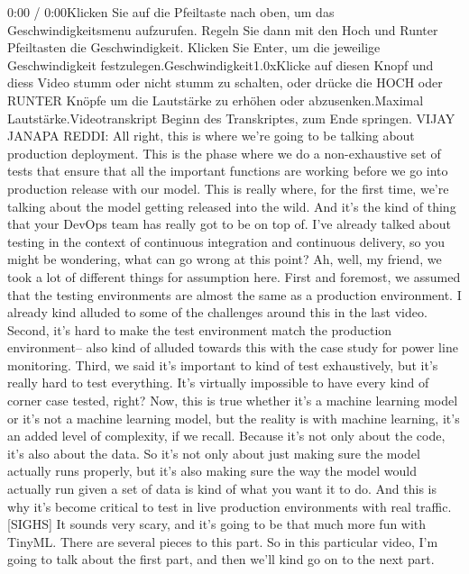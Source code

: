{{{{    0:00 / 0:00Klicken Sie auf die Pfeiltaste nach oben, um das Geschwindigkeitsmenu aufzurufen. Regeln Sie dann mit den Hoch und Runter Pfeiltasten die Geschwindigkeit. Klicken Sie Enter, um die jeweilige Geschwindigkeit festzulegen.Geschwindigkeit1.0xKlicke auf diesen Knopf und diess Video stumm oder nicht stumm zu schalten, oder drücke die HOCH oder RUNTER Knöpfe um die Lautstärke zu erhöhen oder abzusenken.Maximal Lautstärke.Videotranskript
    Beginn des Transkriptes, zum Ende springen.
    VIJAY JANAPA REDDI: All right, this is where
    we're going to be talking about production deployment.
    This is the phase where we do a non-exhaustive set of tests
    that ensure that all the important functions are working before we go
    into production release with our model.
    This is really where, for the first time,
    we're talking about the model getting released into the wild.
    And it's the kind of thing that your DevOps team has really
    got to be on top of.
    I've already talked about testing in the context of continuous integration
    and continuous delivery, so you might be wondering,
    what can go wrong at this point?
    Ah, well, my friend, we took a lot of different things for assumption here.
    First and foremost, we assumed that the testing environments
    are almost the same as a production environment.
    I already kind alluded to some of the challenges
    around this in the last video.
    Second, it's hard to make the test environment match the production
    environment-- also kind of alluded towards this with the case study
    for power line monitoring.
    Third, we said it's important to kind of test exhaustively,
    but it's really hard to test everything.
    It's virtually impossible to have every kind of corner case tested, right?
    Now, this is true whether it's a machine learning model
    or it's not a machine learning model, but the reality
    is with machine learning, it's an added level of complexity, if we recall.
    Because it's not only about the code, it's also about the data.
    So it's not only about just making sure the model actually runs properly,
    but it's also making sure the way the model would actually
    run given a set of data is kind of what you want it to do.
    And this is why it's become critical to test in live production environments
    with real traffic.
    [SIGHS] It sounds very scary, and it's going
    to be that much more fun with TinyML.
    There are several pieces to this part.
    So in this particular video, I'm going to talk about the first part,
    and then we'll kind go on to the next part.
}}}}
